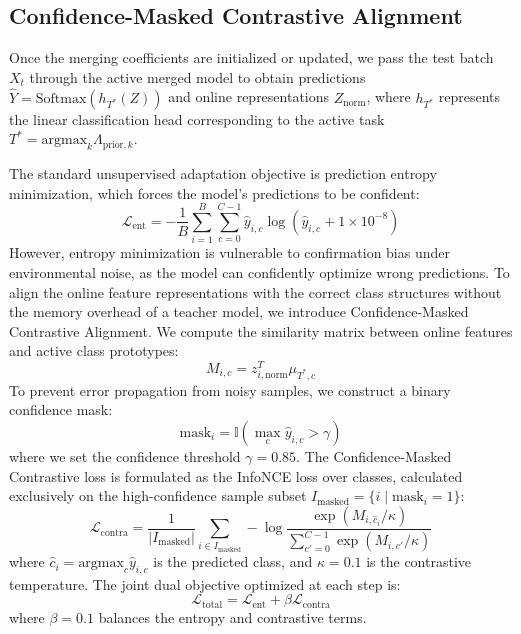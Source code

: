\documentclass{article}
\theoremstyle{plain}
\theoremstyle{definition}
\theoremstyle{remark}
\begin{document}
\subsection{Confidence-Masked Contrastive Alignment}
Once the merging coefficients are initialized or updated, we pass the test batch $X_t$ through the active merged model to obtain predictions $\hat{Y} = \text{Softmax}(h_{T^*}(Z))$ and online representations $Z_{\text{norm}}$, where $h_{T^*}$ represents the linear classification head corresponding to the active task $T^* = \text{argmax}_k \Lambda_{\text{prior},k}$.

The standard unsupervised adaptation objective is prediction entropy minimization, which forces the model's predictions to be confident:
\begin{equation}
  \mathcal{L}_{\text{ent}} = -\frac{1}{B} \sum_{i=1}^B \sum_{c=0}^{C-1} \hat{y}_{i,c} \log(\hat{y}_{i,c} + 1\times 10^{-8})
\end{equation}
However, entropy minimization is vulnerable to confirmation bias under environmental noise, as the model can confidently optimize wrong predictions. To align the online feature representations with the correct class structures without the memory overhead of a teacher model, we introduce Confidence-Masked Contrastive Alignment. We compute the similarity matrix between online features and active class prototypes:
\begin{equation}
  M_{i,c} = z_{i,\text{norm}}^T \mu_{T^*,c}
\end{equation}
To prevent error propagation from noisy samples, we construct a binary confidence mask:
\begin{equation}
  \text{mask}_i = \mathbb{I}(\max_{c} \hat{y}_{i,c} > \gamma)
\end{equation}
where we set the confidence threshold $\gamma = 0.85$. The Confidence-Masked Contrastive loss is formulated as the InfoNCE loss over classes, calculated exclusively on the high-confidence sample subset $I_{\text{masked}} = \{i \mid \text{mask}_i = 1\}$:
\begin{equation}
  \mathcal{L}_{\text{contra}} = \frac{1}{|I_{\text{masked}}|} \sum_{i \in I_{\text{masked}}} -\log \frac{\exp(M_{i,\hat{c}_i}/\kappa)}{\sum_{c'=0}^{C-1} \exp(M_{i,c'}/\kappa)}
\end{equation}
where $\hat{c}_i = \text{argmax}_c \hat{y}_{i,c}$ is the predicted class, and $\kappa = 0.1$ is the contrastive temperature. The joint dual objective optimized at each step is:
\begin{equation}
  \mathcal{L}_{\text{total}} = \mathcal{L}_{\text{ent}} + \beta \mathcal{L}_{\text{contra}}
\end{equation}
where $\beta = 0.1$ balances the entropy and contrastive terms.
\end{document}
